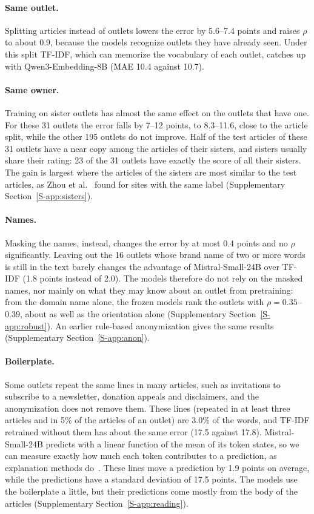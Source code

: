 \documentclass[11pt,a4paper]{article}
\begin{document}
\paragraph{Same outlet.} Splitting articles instead of outlets lowers the error by 5.6--7.4 points and raises $\rho$ to
about 0.9, because the models recognize outlets they have already seen. Under this split TF-IDF, which can memorize the
vocabulary of each outlet, catches up with Qwen3-Embedding-8B (MAE 10.4 against 10.7).

\paragraph{Same owner.} Training on sister outlets has almost the same effect on the outlets that have one. For these 31
outlets the error falls by 7--12 points, to 8.3--11.6, close to the article split, while the other 195 outlets do not
improve. Half of the test articles of these 31 outlets have a near copy among the articles of their sisters, and sisters
usually share their rating: 23 of the 31 outlets have exactly the score of all their sisters. The gain is largest where
the articles of the sisters are most similar to the test articles, as Zhou et al.~\cite{zhou2021hidden} found for sites
with the same label (Supplementary Section~\ref{S-app:sisters}).

\paragraph{Names.} Masking the names, instead, changes the error by at most 0.4 points and no $\rho$ significantly.
Leaving out the 16 outlets whose brand name of two or more words is still in the text barely changes the advantage of
Mistral-Small-24B over TF-IDF (1.8 points instead of 2.0). The models therefore do not rely on the masked names, nor
mainly on what they may know about an outlet from pretraining: from the domain name alone, the frozen models rank the
outlets with $\rho = 0.35$--$0.39$, about as well as the orientation alone (Supplementary Section~\ref{S-app:robust}). An
earlier rule-based anonymization gives the same results (Supplementary Section~\ref{S-app:anon}).

\paragraph{Boilerplate.} Some outlets repeat the same lines in many articles, such as invitations to subscribe to a
newsletter, donation appeals and disclaimers, and the anonymization does not remove them. These lines (repeated in at
least three articles and in 5\% of the articles of an outlet) are 3.0\% of the words, and TF-IDF retrained without them
has about the same error (17.5 against 17.8). Mistral-Small-24B predicts with a linear function of the mean of its token
states, so we can measure exactly how much each token contributes to a prediction, as explanation methods
do~\cite{kozik2024explainability}. These lines move a prediction by 1.9 points on average, while the predictions have a
standard deviation of 17.5 points. The models use the boilerplate a little, but their predictions come mostly from the
body of the articles (Supplementary Section~\ref{S-app:reading}).
\end{document}
